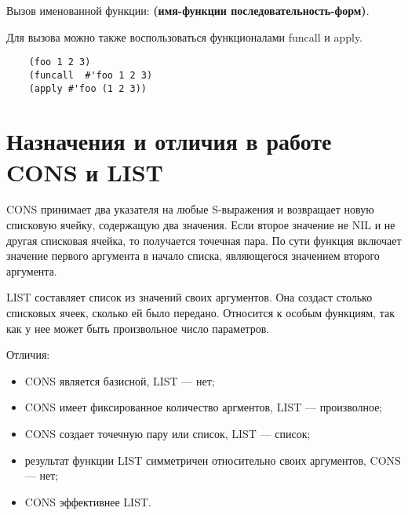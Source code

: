 Вызов именованной функции: \textbf{(имя-функции последовательность-форм)}. 

Для вызова можно также воспользоваться функционалами funcall и apply.

\begin{lstlisting}
    (foo 1 2 3)
    (funcall  #'foo 1 2 3)
    (apply #'foo (1 2 3))
\end{lstlisting}

\section{Назначения и отличия в работе CONS и LIST}

CONS принимает два указателя на любые S-выражения и возвращает новую списковую ячейку, содержащую два значения. Если второе значение не NIL и не другая списковая ячейка, то получается точечная пара. По сути функция включает значение первого аргумента в начало списка, являющегося значением второго аргумента.

LIST составляет список из значений своих аргументов. Она создаст столько списковых ячеек, сколько ей было передано.  Относится к особым функциям, так как у нее может быть произвольное число параметров. 

Отличия:
\begin{itemize}
    \item CONS является базисной, LIST --- нет;
    \item CONS имеет фиксированное количество аргментов, LIST --- произволное;
    \item CONS создает точечную пару или список, LIST --- список;
    \item результат функции LIST симметричен относительно своих аргументов, CONS --- нет;
    \item CONS эффективнее LIST.
\end{itemize}

